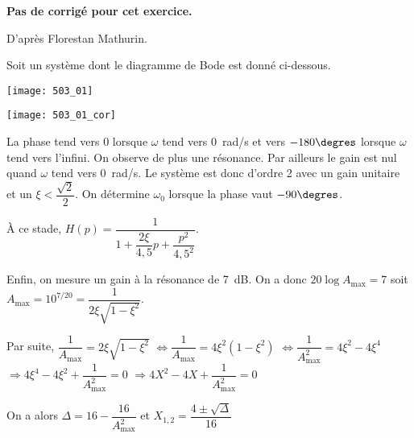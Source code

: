 \normaltrue \difficilefalse \tdifficilefalse
\correctiontrue


\setcounter{numques}{0}

\ifcorrection
\else
\textbf{Pas de corrigé pour cet exercice.}
\fi


\ifprof 
\else
\begin{flushright}
D'après Florestan Mathurin.
\end{flushright}

Soit un système dont le diagramme de Bode est donné ci-dessous.
\begin{center}
\texttt{[image: 503\_01]}
\end{center}
\fi

\ifprof
\begin{center}
\texttt{[image: 503\_01\_cor]}
\end{center}
\else
\fi


\ifprof
La phase tend vers 0 lorsque $\omega$ tend vers \SI{0}{rad/s} et vers $-180\degres$ lorsque $\omega$ tend vers l'infini. 
On observe de plus une résonance. Par ailleurs le gain est nul quand $\omega$ tend vers \SI{0}{rad/s}. 
Le système est donc d'ordre 2 avec un gain unitaire et un $\xi<\dfrac{\sqrt{2}}{2}$. 
On détermine $\omega_0$ lorsque la phase vaut $-90\degres$.

À ce stade, $H(p)=\dfrac{1}{1+\dfrac{2\xi}{4,5}p+\dfrac{p^2}{4,5^2}}$.

Enfin, on mesure un gain à la résonance de \SI{7}{dB}. 
On a donc $20\log A_{\text{max}}=7$ soit $A_{\text{max}}=10^{7/20}= \dfrac{1}{2\xi\sqrt{1-\xi^2}}$.

Par suite, 
 $\dfrac{1}{A_{\text{max}}}=2\xi\sqrt{1-\xi^2}$
 $\Leftrightarrow \dfrac{1}{A_{\text{max}}}=4\xi^2\left(1-\xi^2\right)$
 $\Leftrightarrow \dfrac{1}{A^2_{\text{max}}}=4\xi^2-4\xi^4$
  $\Rightarrow 4\xi^4 -4\xi^2+ \dfrac{1}{A^2_{\text{max}}}=0$ 
  $\Rightarrow 4X^2 -4X+ \dfrac{1}{A^2_{\text{max}}}=0$
  
 On a alors $\Delta = 16 -  \dfrac{16}{A^2_{\text{max}}}$ et $X_{1,2} = \dfrac{4\pm\sqrt{\Delta}}{16}$
 
